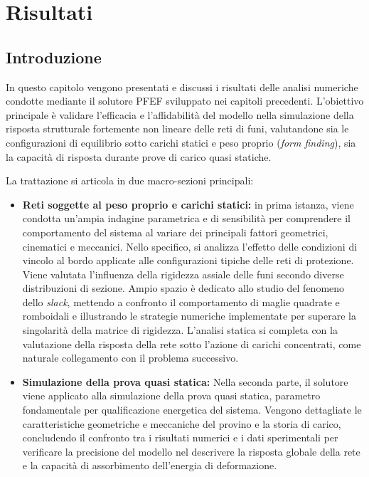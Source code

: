 \chapter{Risultati}\label{chap:capitolo4}
\section{Introduzione}
In questo capitolo vengono presentati e discussi i risultati delle analisi numeriche condotte mediante il solutore PFEF sviluppato nei capitoli precedenti. L'obiettivo principale è validare l'efficacia e l'affidabilità del modello nella simulazione della risposta strutturale fortemente non lineare delle reti di funi, valutandone sia le configurazioni di equilibrio sotto carichi statici e peso proprio (\textit{form finding}), sia la capacità di risposta durante prove di carico quasi statiche. 

La trattazione si articola in due macro-sezioni principali:

\begin{itemize}
    \item \textbf{Reti soggette al peso proprio e carichi statici:} in prima istanza, viene condotta un'ampia indagine parametrica e di sensibilità per comprendere il comportamento del sistema al variare dei principali fattori geometrici, cinematici e meccanici. Nello specifico, si analizza l'effetto delle condizioni di vincolo al bordo applicate alle configurazioni tipiche delle reti di protezione. Viene valutata l'influenza della rigidezza assiale delle funi secondo diverse distribuzioni di sezione. Ampio spazio è dedicato allo studio del fenomeno dello \textit{slack}, mettendo a confronto il comportamento di maglie quadrate e romboidali e illustrando le strategie numeriche implementate per superare la singolarità della matrice di rigidezza. L'analisi statica si completa con la valutazione della risposta della rete sotto l'azione di carichi concentrati, come naturale collegamento con il problema successivo.
    \item \textbf{Simulazione della prova quasi statica:} Nella seconda parte, il solutore viene applicato alla simulazione della prova quasi statica, parametro fondamentale per qualificazione energetica del sistema. Vengono dettagliate le caratteristiche geometriche e meccaniche del provino e la storia di carico, concludendo il confronto tra i risultati  numerici e i dati sperimentali per verificare la precisione del modello nel descrivere la risposta globale della rete e la capacità di assorbimento dell'energia di deformazione. 
\end{itemize}

